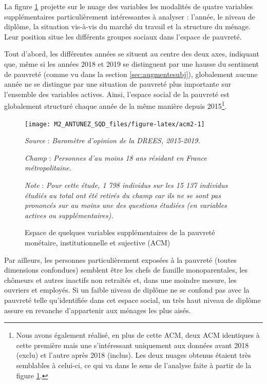 \documentclass[12pt,a4paper]{reedthesis}
\begin{document}
La figure \ref{fig:acm2} projette sur le nuage des variables les modalités de quatre variables supplémentaires particulièrement intéressantes à analyser : l'année, le niveau de diplôme, la situation vis-à-vis du marché du travail et la structure du ménage. Leur position situe les différents groupes sociaux dans l'espace de pauvreté.

Tout d'abord, les différentes années se situent au centre des deux axes, indiquant que, même si les années 2018 et 2019 se distinguent par une hausse du sentiment de pauvreté (comme vu dans la section \ref{sec:augmentesubj}), globalement aucune année ne se distingue par une situation de pauvreté plus importante sur l'ensemble des variables actives. Ainsi, l'espace social de la pauvreté est globalement structuré chaque année de la même manière depuis 2015\footnote{Nous avons également réalisé, en plus de cette ACM, deux ACM identiques à cette première mais une s'intéressant uniquement aux données avant 2018 (exclu) et l'autre après 2018 (inclus). Les deux nuages obtenus étaient très semblables à celui-ci, ce qui va dans le sens de l'analyse faite à partir de la figure \ref{fig:acm2}.}.
\begin{figure}[!ht]

{\centering \texttt{[image: M2\_ANTUNEZ\_SQD\_files/figure-latex/acm2-1]} 

}

\caption[Espace de quelques variables supplémentaires de la pauvreté monétaire, institutionnelle et sujective (ACM)]{Espace de quelques variables supplémentaires de la pauvreté monétaire, institutionnelle et sujective (ACM)}\label{fig:acm2}

\footnotesize


\emph{Source} : \emph{Baromètre d’opinion de la DREES, 2015-2019.}


\emph{Champ} : \emph{Personnes d’au moins 18 ans résidant en France métropolitaine.}


\emph{Note} : \emph{Pour cette étude, 1 798 individus sur les 15 137 individus étudiés au total ont été retirés du champ car ils ne se sont pas prononcés sur au moins une des questions étudiées (en variables actives ou supplémentaires).}
\normalsize\end{figure}

Par ailleurs, les personnes particulièrement exposées à la pauvreté (toutes dimensions confondues) semblent être les chefs de famille monoparentales, les chômeurs et autres inactifs non retraités et, dans une moindre mesure, les ouvriers et employés. Si un faible niveau de diplôme ne se confond pas avec la pauvreté telle qu'identifiée dans cet espace social, un très haut niveau de diplôme assure en revanche d'appartenir aux ménages les plus aisés.
\end{document}
